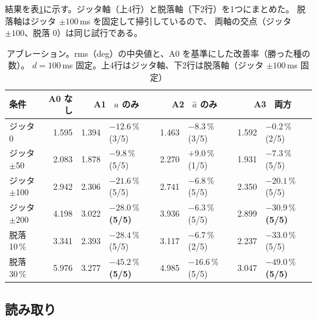 \documentclass[11pt,a4paper]{article}
\newcommand{\keyp}[1]{\textbf{\textcolor{blue!45!black}{#1}}}
\begin{document}
結果を表\ref{tab:e3}に示す。ジッタ軸（上4行）と脱落軸（下2行）を1つにまとめた。
脱落軸はジッタ $\pm100$\,ms を固定して掃引しているので、
両軸の交点（ジッタ $\pm100$、脱落 0）は同じ試行である。

\begin{table}[htbp]
\centering
\small
\caption{アブレーション。rms（deg）の中央値と、A0 を基準にした改善率（勝った種の数）。
$d=100$\,ms 固定。上4行はジッタ軸、下2行は脱落軸（ジッタ $\pm100$\,ms 固定）}
\label{tab:e3}
\begin{tabular}{@{}l r rl rl rl@{}}
\toprule
\textbf{条件} & \textbf{A0 なし} &
\multicolumn{2}{c}{\textbf{A1 \ $a$ のみ}} &
\multicolumn{2}{c}{\textbf{A2 \ $\hat a$ のみ}} &
\multicolumn{2}{c}{\textbf{A3 \ 両方}} \\
\midrule
ジッタ 0        & 1.595 & 1.394 & $-12.6\,\%$ (3/5) & 1.463 & $-8.3\,\%$ (3/5) & 1.592 & $-0.2\,\%$ (2/5) \\
ジッタ $\pm$50   & 2.083 & 1.878 & $-9.8\,\%$ (5/5)  & 2.270 & $+9.0\,\%$ (1/5) & 1.931 & $-7.3\,\%$ (5/5) \\
ジッタ $\pm$100  & 2.942 & 2.306 & $-21.6\,\%$ (5/5) & 2.741 & $-6.8\,\%$ (5/5) & 2.350 & $-20.1\,\%$ (5/5) \\
ジッタ $\pm$200  & 4.198 & 3.022 & \keyp{$-28.0\,\%$ (5/5)} & 3.936 & $-6.3\,\%$ (5/5) & 2.899 & \keyp{$-30.9\,\%$ (5/5)} \\
\midrule
脱落 10\,\%      & 3.341 & 2.393 & $-28.4\,\%$ (5/5) & 3.117 & $-6.7\,\%$ (2/5) & 2.237 & $-33.0\,\%$ (5/5) \\
脱落 30\,\%      & 5.976 & 3.277 & \keyp{$-45.2\,\%$ (5/5)} & 4.985 & $-16.6\,\%$ (5/5) & 3.047 & \keyp{$-49.0\,\%$ (5/5)} \\
\bottomrule
\end{tabular}
\end{table}

\subsection{読み取り}
\end{document}
